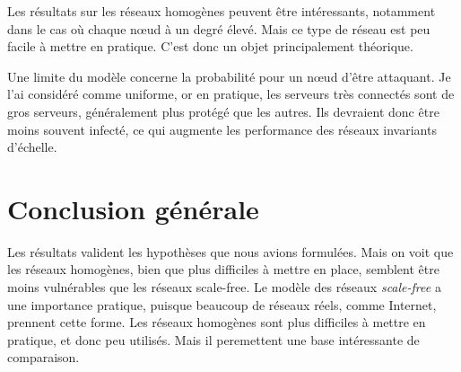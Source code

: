 \documentclass[12pt,a4paper]{article}
\begin{document}
Les résultats sur les réseaux homogènes peuvent être intéressants, notamment dans le cas où chaque nœud à un degré élevé.
Mais ce type de réseau est peu facile à mettre en pratique.
C'est donc un objet principalement théorique.

Une limite du modèle concerne la probabilité pour un nœud d'être attaquant.
Je l'ai considéré comme uniforme, or en pratique, les serveurs très connectés sont de gros serveurs, généralement plus protégé que les autres.
Ils devraient donc être moins souvent infecté, ce qui augmente les performance des réseaux invariants d'échelle.



\section{Conclusion générale} %

	Les résultats valident les hypothèses que nous avions formulées. Mais on voit que les réseaux homogènes, bien que plus difficiles à mettre en place, semblent être moins vulnérables que les réseaux scale-free. 
Le modèle des réseaux \emph{scale-free} a une importance pratique, puisque beaucoup de réseaux réels, comme Internet, prennent cette forme. Les réseaux homogènes sont plus difficiles à mettre en pratique, et donc peu utilisés. Mais il peremettent une base intéressante de comparaison.
\end{document}
